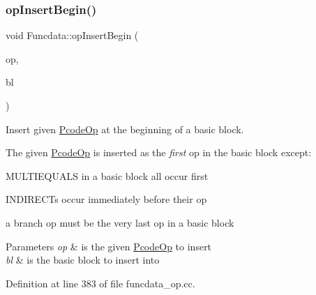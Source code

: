 \subsubsection{\texorpdfstring{opInsertBegin()}{opInsertBegin()}}
{\footnotesize\ttfamily void Funcdata\+::op\+Insert\+Begin (\begin{DoxyParamCaption}\item[{\mbox{\hyperlink{class_pcode_op}{Pcode\+Op}} $\ast$}]{op,  }\item[{\mbox{\hyperlink{class_block_basic}{Block\+Basic}} $\ast$}]{bl }\end{DoxyParamCaption})}



Insert given \mbox{\hyperlink{class_pcode_op}{Pcode\+Op}} at the beginning of a basic block. 

The given \mbox{\hyperlink{class_pcode_op}{Pcode\+Op}} is inserted as the {\itshape first} op in the basic block except\+:
\begin{DoxyItemize}
\item M\+U\+L\+T\+I\+E\+Q\+U\+A\+LS in a basic block all occur first
\item I\+N\+D\+I\+R\+E\+C\+Ts occur immediately before their op
\item a branch op must be the very last op in a basic block
\end{DoxyItemize}


\begin{DoxyParams}{Parameters}
{\em op} & is the given \mbox{\hyperlink{class_pcode_op}{Pcode\+Op}} to insert \\
\hline
{\em bl} & is the basic block to insert into \\
\hline
\end{DoxyParams}


Definition at line 383 of file funcdata\+\_\+op.\+cc.

